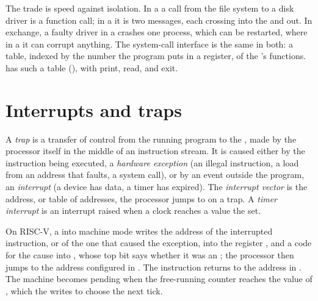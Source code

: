 The trade is speed against isolation. In a  a call from the file system to a disk driver is a function call; in a  it is two messages, each crossing into the  and out. In exchange, a faulty driver in a  crashes one process, which can be restarted, where in a  it can corrupt anything. The system-call interface is the same in both: a table, indexed by the number the program puts in a register, of the 's functions.  has such a table (), with print, read,  and exit.

\section{Interrupts and traps}\label{sec:b3:kernel-and-scheduling:traps}

\begin{definition}\label{def:b3:kernel-and-scheduling:interrupt}
A \emph{trap} is a transfer of control from the running program to the , made by the processor itself in the middle of an instruction stream. It is caused either by the instruction being executed, a \emph{hardware exception} (an illegal instruction, a load from an address that faults, a system call), or by an event outside the program, an \emph{interrupt} (a device has data, a timer has expired). The \emph{interrupt vector} is the address, or table of addresses, the processor jumps to on a trap. A \emph{timer interrupt} is an interrupt raised when a clock reaches a value the  set.
\end{definition}

On RISC-V, a  into machine mode writes the address of the interrupted instruction, or of the one that caused the exception, into the register , and a code for the cause into , whose top bit says whether it was an ; the processor then jumps to the address configured in . The instruction  returns to the address in . %
The machine  becomes pending when the free-running counter  reaches the value of , which the  writes to choose the next tick. %

